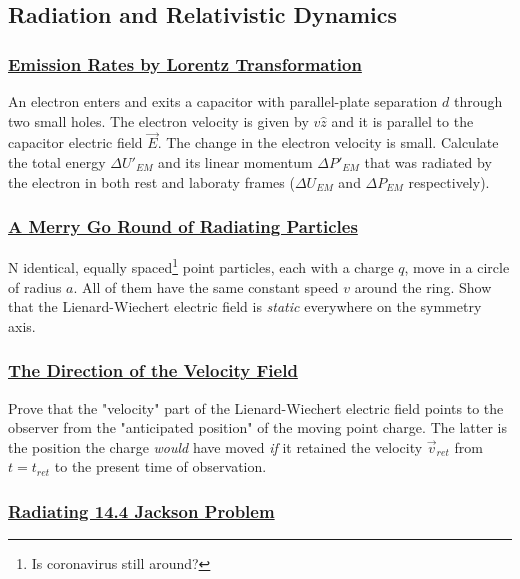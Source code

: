 
\subsection{Radiation and Relativistic Dynamics}

\subsubsection{\hyperref[Emission Rates by Lorentz Transformation]{Emission Rates by Lorentz Transformation}}

An electron enters and exits a capacitor with parallel-plate separation $d$ through two small holes. The electron velocity is given by $v \hat{z}$ and it is parallel to the capacitor electric field $\vec{E}$. The change in the electron velocity is small. Calculate the total energy $\Delta U'_{EM}$ and its linear momentum $\Delta P'_{EM}$ that was radiated by the electron in both rest and laboraty frames ($\Delta U_{EM}$ and  $\Delta P_{EM}$ respectively).

\subsubsection{\hyperref[A Merry Go Round of Radiating Particles]{A Merry Go Round of Radiating Particles}}

N identical, equally spaced\footnote{Is coronavirus still around?} point particles, each with a charge $q$, move in a circle of radius $a$. All of them have the same constant speed $v$ around the ring. Show that the Lienard-Wiechert electric field is \textit{static} everywhere on the symmetry axis.

\subsubsection{\hyperref[The Direction of the Velocity Field]{The Direction of the Velocity Field}}

Prove that the "velocity" part of the Lienard-Wiechert electric field points to the observer from the "anticipated position" of the moving point charge. The latter is the position the charge \textit{would} have moved \textit{if} it retained the velocity $\vec{v}_{ret}$ from $t = t_{ret}$ to the present time of observation.

\subsubsection{\hyperref[Radiating 14.4 Jackson Problem]{Radiating 14.4 Jackson Problem}}

